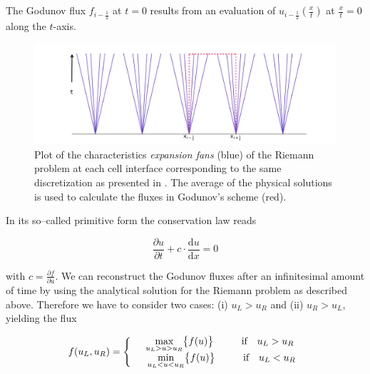 The Godunov flux $f_{i-\frac{1}{2}}$ at $t = 0$  results from an evaluation of $u_{i-\frac{1}{2}}(\frac{x}{t})$ at $\frac{x}{t} = 0$ along the $t$-axis.

\begin{figure}[ht]
 \centering
 \includegraphics[width=\textwidth]{Figures/characteristics}
 \captionsetup{justification=justified,singlelinecheck=false,width=\linewidth}
 \decoRule
 \caption[Characteristics in Godunov's scheme]{Plot of the characteristics \textit{expansion fans} (blue) of the Riemann problem at each cell interface corresponding to the same discretization as presented in .
                                               The average of the physical solutions is used to calculate the fluxes in Godunov's scheme (red).}
 \label{fig:Characteristics}
\end{figure}

In its so--called primitive form the conservation law reads

\begin{equation}
  \frac{\partial u}{\partial t} + c\cdot\frac{\mathrm{d}u}{\mathrm{d}x} = 0
\label{eq:Primitive_form}
\end{equation}

with $c=\frac{\partial f}{\partial u}$.
We can reconstruct the Godunov fluxes after an infinitesimal amount of time by using the analytical solution for the Riemann problem as described above.
Therefore we have to consider two cases: (i) $u_{L} > u_{R}$ and (ii) $u_{R} > u_{L}$, yielding the flux

\begin{equation}
  f(u_{L}, u_{R}) = \left\{\begin{array}{l l}
                    &\underset{u_{L}>u>u_{R}}{\text{max}}\big\{f(u)\big\} \hspace{1cm} \text{if} \quad u_{L}>u_{R}\\
                    &\,\underset{u_{L}<u<u_{R}}{\text{min}}\big\{f(u)\big\} \hspace{1cm} \text{if} \quad u_{L}<u_{R}
                    \end{array} \right.
\end{equation}

